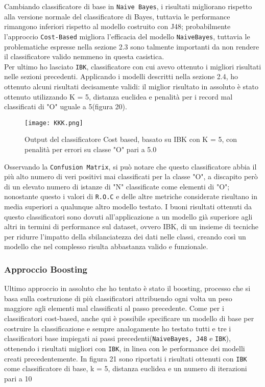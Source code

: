 Cambiando classificatore di base in \texttt{Naive Bayes}, i risultati migliorano rispetto alla versione normale del classificatore di Bayes, tuttavia le performance rimangono inferiori rispetto al modello costruito con J48; probabilmente l'approccio \texttt{Cost-Based} migliora l'efficacia del modello \texttt{NaiveBayes}, tuttavia le problematiche espresse nella sezione 2.3 sono talmente importanti da non rendere il classificatore valido nemmeno in questa casistica.\\
Per ultimo ho lasciato \texttt{IBK}, classificatore con cui avevo ottenuto i migliori risultati nelle sezioni precedenti. Applicando i modelli descritti nella sezione 2.4, ho ottenuto alcuni risultati decisamente validi: il miglior risultato in assoluto è stato ottenuto utilizzando K = 5, distanza euclidea e penalità per i record mal classificati di "O" uguale a 5(figura 20). 

\begin{figure}[H]
	\texttt{[image: KKK.png]}
	\caption{Output del classificatore Cost based, basato su IBK con K = 5, con penalità per errori su classe "O" pari a 5.0}
\end{figure} 

Osservando la \texttt{Confusion Matrix}, si può notare che questo classificatore abbia il più alto numero di veri positivi mai classificati per la classe "O", a discapito però di un elevato numero di istanze di "N" classificate come elementi di "O"; nonostante questo i valori di \texttt{R.O.C} e delle altre metriche considerate risultano in media superiori a qualunque altro modello testato. 
I buoni risultati ottenuti da questo classificatori sono dovuti all'applicazione a un modello già superiore agli altri in termini di performance sul dataset, ovvero IBK, di un insieme di tecniche per ridurre l'impatto della sbilanciatezza dei dati nelle classi, creando così un modello che nel complesso risulta abbastanza valido e funzionale.

  \subsubsection{Approccio Boosting}
Ultimo approccio in assoluto che ho tentato è stato il boosting, processo che si basa sulla costruzione di più classificatori attribuendo ogni volta un peso maggiore agli elementi mal classificati al passo precedente.
Come per i classificatori cost-based, anche qui è possibile specificare un modello di base per costruire la classificazione e sempre analogamente ho testato tutti e tre i classificatori base impiegati ai passi precedenti(\texttt{NaiveBayes, J48} e  \texttt{IBK}), ottenendo i risultati migliori con \texttt{IBK}, in linea con le performance dei modelli creati precedentemente.
In figura 21 sono riportati i risultati ottenuti con \texttt{IBK} come classificatore di base, k = 5, distanza euclidea e un numero di iterazioni pari a 10  

